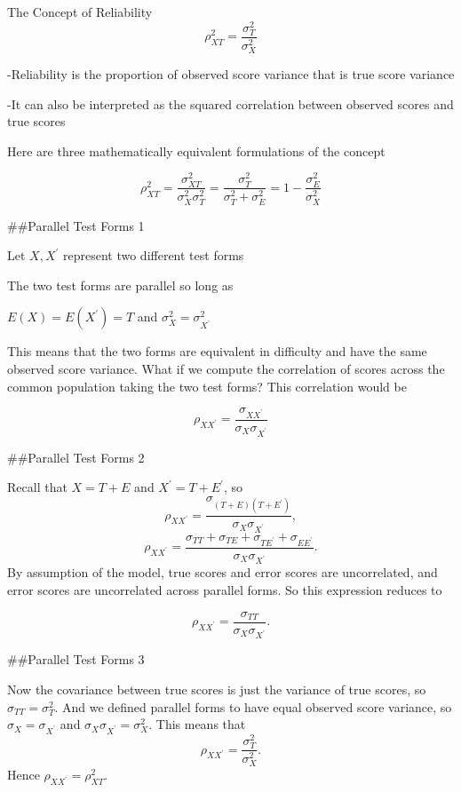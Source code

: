 \documentclass[
  ignorenonframetext,
]{beamer}
\begin{document}
\begin{frame}{The Concept of Reliability}
\protect\hypertarget{the-concept-of-reliability}{}
\[\tag{6}\rho^2_{XT}=\frac{\sigma^2_{T}}{\sigma^2_{X}}\]

-Reliability is the proportion of observed score variance that is true
score variance

-It can also be interpreted as the squared correlation between observed
scores and true scores

Here are three mathematically equivalent formulations of the concept

\[\rho^2_{XT}=\frac{\sigma^2_{XT}}{\sigma^2_{X}\sigma^2_{T}}=\frac{\sigma^2_{T}}{\sigma^2_{T}+\sigma^2_{E}}=1-\frac{\sigma^2_{E}}{\sigma^2_{X}}\]

\#\#Parallel Test Forms 1

Let \(X, X^\prime\) represent two different test forms

The two test forms are parallel so long as

\(E(X)=E(X^\prime)=T\) and \(\sigma^2_{X} = \sigma^2_{X^\prime}\)

This means that the two forms are equivalent in difficulty and have the
same observed score variance. What if we compute the correlation of
scores across the common population taking the two test forms? This
correlation would be

\[\rho_{XX^\prime}=\frac{\sigma_{XX^\prime}}{\sigma_{X}\sigma_{X^\prime}}\]

\#\#Parallel Test Forms 2

Recall that \(X = T + E\) and \(X^\prime = T + E^\prime\), so
\[\rho_{XX^\prime}=\frac{\sigma_{(T+E)(T+E^\prime)}}{\sigma_{X}\sigma_{X^\prime}},\]
\[\rho_{XX^\prime}=\frac{\sigma_{TT}+\sigma_{TE}+\sigma_{TE^\prime}+\sigma_{EE^\prime}}{\sigma_{X}\sigma_{X^\prime}}.\]
By assumption of the model, true scores and error scores are
uncorrelated, and error scores are uncorrelated across parallel forms.
So this expression reduces to

\[\rho_{XX^\prime}=\frac{\sigma_{TT}}{\sigma_{X}\sigma_{X^\prime}}.\]

\#\#Parallel Test Forms 3

Now the covariance between true scores is just the variance of true
scores, so \(\sigma_{TT}=\sigma^2_{T}\). And we defined parallel forms
to have equal observed score variance, so
\(\sigma_{X}=\sigma_{X^\prime}\) and
\(\sigma_{X}\sigma_{X^\prime}=\sigma^2_{X}\). This means that
\[\tag{7}\rho_{XX^\prime}=\frac{\sigma^2_{T}}{\sigma^2_{X}}.\] Hence
\(\rho_{XX^\prime}=\rho^2_{XT}\).


\end{frame}
\end{document}
